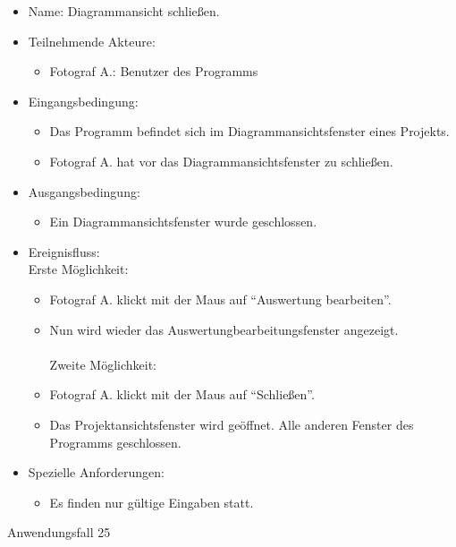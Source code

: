 \begin{itemize}
\item Name: Diagrammansicht schließen.
\item Teilnehmende Akteure:
\begin{itemize}
\item Fotograf A.: Benutzer des Programms
\end{itemize}
\item Eingangsbedingung:
\begin{itemize}
\item Das Programm befindet sich im Diagrammansichtsfenster eines Projekts.
\item Fotograf A. hat vor das Diagrammansichtsfenster zu schließen.
\end{itemize}
\item Ausgangsbedingung:
\begin{itemize}
\item Ein Diagrammansichtsfenster wurde geschlossen.
\end{itemize}
\item Ereignisfluss: \\
Erste Möglichkeit:
\begin{itemize}
\item Fotograf A. klickt mit der Maus auf "`Auswertung bearbeiten"'.
\item Nun wird wieder das Auswertungbearbeitungsfenster angezeigt.\\\\Zweite Möglichkeit:\\
\item Fotograf A. klickt mit der Maus auf "`Schließen"'.
\item Das Projektansichtsfenster wird geöffnet. Alle anderen Fenster des Programms geschlossen.
\end{itemize}
\item Spezielle Anforderungen:
\begin{itemize}
\item Es finden nur gültige Eingaben statt.
\end{itemize}
\end{itemize}

\begin{description}
\item[Anwendungsfall 25]
\end{description}
 
